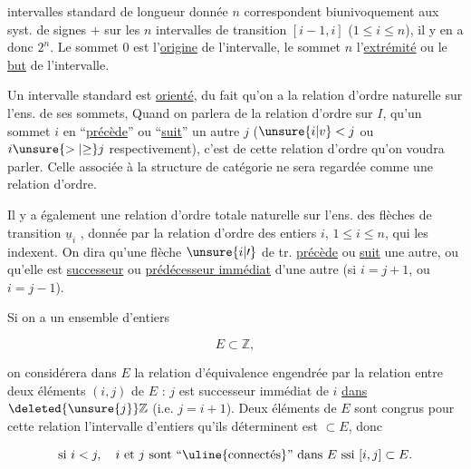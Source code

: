 
intervalles standard de longueur donnée $n$ correspondent biunivoquement aux syst. de signes \deleted{\unsure{$\pm$}} $+$  sur les $n$ intervalles de transition $[i-1,i]$ ($1\leq i\leq n$), il y en a donc $2^n$. Le sommet $0$ est l'\uline{origine}  de l'intervalle, le sommet $n$ l'\uline{extrémité} ou le \uline{but} de l'intervalle.

Un intervalle standard est \uline{orienté}, du fait qu'on a la relation d'ordre  naturelle sur l'ens. de ses sommets,  Quand on parlera de la relation d'ordre sur $I$, qu'un sommet $i$ en ``\uline{précède}'' ou ``\uline{suit}'' un autre $j$ ($\unsure{i|v}<j$ ou $i\unsure{>|{\geq}}j$ respectivement), c'est de cette relation d'ordre qu'on voudra parler. Celle associée à la structure de catégorie ne sera  regardée comme une relation d'ordre.

Il y a également une relation d'ordre totale naturelle sur l'ens. des flèches de transition $\underline{u}_i$ , donnée par  la relation d'ordre des entiers $i$, $1\leq i\leq n$, qui les indexent. On dira qu'une flèche $\unsure{i|\prime}$ de tr. \uline{précède} ou \uline{suit} une autre, ou  qu'elle est \uline{successeur}  ou \uline{prédécesseur immédiat} d'une autre (si $i=j+1$, ou $i=j-1$).

Si on a un ensemble d'entiers

\[E\subset\mathbb{Z},\]

on  considérera dans $E$ la relation d'équivalence engendrée par la relation entre deux éléments $(i,j)$ de $E$ : $j$ est successeur immédiat de $i$ \uline{dans} $\deleted{\unsure{j}}\mathbb{Z}$ (i.e. $j=i+1$). Deux éléments  de $E$  sont congrus pour cette relation   l'intervalle d'entiers qu'ils déterminent est $\subset E$, donc

\[\text{si }i<j,\quad i\text{ et }j\text{ sont ``\uline{connectés}'' dans }E\text{ ssi }[i,j]\subset E.\]

